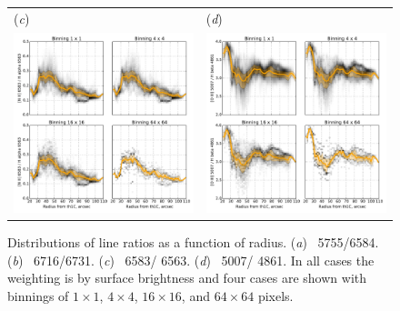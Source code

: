 \documentclass[preprint]{aastex}
\begin{document}
\begin{figure}[p]
\begin{tabular}{ll}
    (\textit{c}) & (\textit{d}) \\
    \includegraphics{rnii-ha-vs-radius-binning-new} &
    \includegraphics{roiii-hb-vs-radius-binning-new} \\
  \end{tabular}
  \caption{Distributions of line ratios as a function of radius.
    (\textit{a})~\nii{} 5755/6584. (\textit{b})~\sii{} 6716/6731.
    (\textit{c})~\nii{} 6583/\ha{} 6563. (\textit{d})~\oiii{}
    5007/\hb{} 4861. In all cases the weighting is by \ha{} surface
    brightness and four cases are shown with binnings of \(1\times
    1\), \(4 \times 4\), \(16 \times 16\), and \(64 \times 64\)
    pixels.}
  \label{fig:ratio-hist-vs-radius}
\end{figure}
\end{document}
